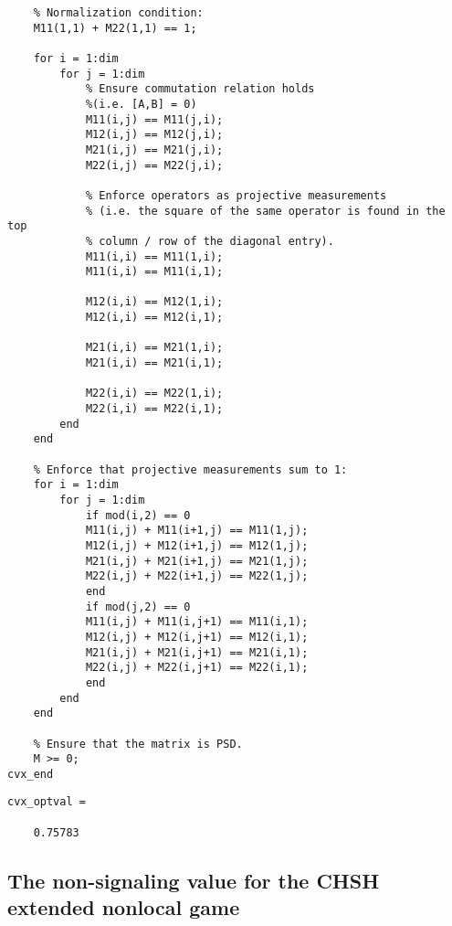 \begin{verbatim}
    % Normalization condition:
    M11(1,1) + M22(1,1) == 1;
        
    for i = 1:dim
        for j = 1:dim
            % Ensure commutation relation holds
            %(i.e. [A,B] = 0)            
            M11(i,j) == M11(j,i);
            M12(i,j) == M12(j,i);
            M21(i,j) == M21(j,i);
            M22(i,j) == M22(j,i);
            
            % Enforce operators as projective measurements
            % (i.e. the square of the same operator is found in the top
            % column / row of the diagonal entry). 
            M11(i,i) == M11(1,i);
            M11(i,i) == M11(i,1);
                        
            M12(i,i) == M12(1,i);
            M12(i,i) == M12(i,1);

            M21(i,i) == M21(1,i);
            M21(i,i) == M21(i,1);

            M22(i,i) == M22(1,i);
            M22(i,i) == M22(i,1);
        end
    end  

	% Enforce that projective measurements sum to 1:
    for i = 1:dim
    	for j = 1:dim
    		if mod(i,2) == 0    			
    		M11(i,j) + M11(i+1,j) == M11(1,j);
    		M12(i,j) + M12(i+1,j) == M12(1,j);
			M21(i,j) + M21(i+1,j) == M21(1,j);
			M22(i,j) + M22(i+1,j) == M22(1,j);
    		end
    		if mod(j,2) == 0
    		M11(i,j) + M11(i,j+1) == M11(i,1);
    		M12(i,j) + M12(i,j+1) == M12(i,1);
    		M21(i,j) + M21(i,j+1) == M21(i,1);
    		M22(i,j) + M22(i,j+1) == M22(i,1);   		    		
	    	end
    	end
    end

    % Ensure that the matrix is PSD.
    M >= 0;
cvx_end
\end{verbatim}
\color{black}
\color{lightgray} 
\begin{verbatim}     
cvx_optval =

    0.75783
\end{verbatim}
\color{black}


\subsection{The non-signaling value for the CHSH extended nonlocal game} \label{code:ns-val-chsh-enlg}

